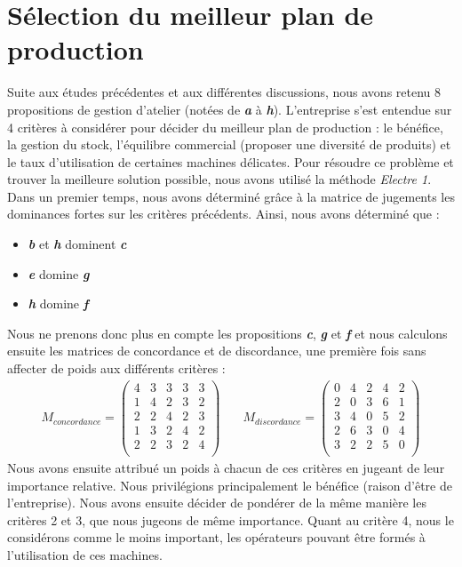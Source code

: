 \documentclass[12pt]{article}
\begin{document}
\section{Sélection du meilleur plan de production}
Suite aux études précédentes et aux différentes discussions, nous avons retenu 8 propositions de gestion d'atelier (notées de \textbf{\emph{a}} à \textbf{\emph{h}}).
L'entreprise s'est entendue sur 4 critères à considérer pour décider du meilleur plan de production : le bénéfice, la gestion du stock, l'équilibre commercial (proposer une diversité de produits) et le taux d'utilisation de certaines machines délicates.
Pour résoudre ce problème et trouver la meilleure solution possible, nous avons utilisé la méthode \emph{Electre 1}.
Dans un premier temps, nous avons déterminé grâce à la matrice de jugements les dominances fortes sur les critères précédents. Ainsi, nous avons déterminé que :
\begin{itemize}
\item \textbf{\emph{b}} et \textbf{\emph{h}} dominent \textbf{\emph{c}}
\item \textbf{\emph{e}} domine \textbf{\emph{g}}
\item \textbf{\emph{h}} domine \textbf{\emph{f}}
\end{itemize}
Nous ne prenons donc plus en compte les propositions \textbf{\emph{c}}, \textbf{\emph{g}} et \textbf{\emph{f}} et nous calculons ensuite les matrices de concordance et de discordance, une première fois sans affecter de poids aux différents critères :
\begin{align*}
M_{concordance} =
 \begin{pmatrix}
  4	&3	&3	&3	&3\\
  1	&4	&2	&3	&2\\
  2	&2	&4	&2	&3\\
  1	&3	&2	&4	&2\\
  2	&2	&3	&2	&4\\
 \end{pmatrix}& \quad
 M_{discordance} =
 \begin{pmatrix}
  0	&4	&2	&4	&2\\
  2	&0	&3	&6	&1\\
  3	&4	&0	&5	&2\\
  2	&6	&3	&0	&4\\
  3	&2	&2	&5	&0\\
 \end{pmatrix}
\end{align*} 
Nous avons ensuite attribué un poids à chacun de ces critères en jugeant de leur importance relative. Nous privilégions principalement le bénéfice (raison d'être de l'entreprise). Nous avons ensuite décider de pondérer de la même manière les critères 2 et 3, que nous jugeons de même importance. Quant au critère 4, nous le considérons comme le moins important, les opérateurs pouvant être formés à l'utilisation de ces machines.
\end{document}
